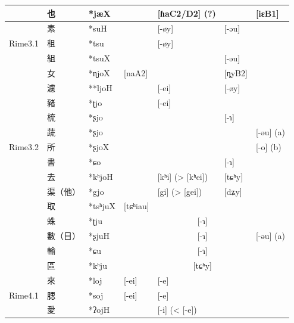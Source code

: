 \documentclass{scrbook}
\newcounter{c}[subsubsection]
\begin{document}
\begin{sloppypar}
\begin{landscape}
\begin{longtable}[htbp]{lllllll}
          & 也     & *jæX  &    & [ɦaC2/D2] (?) &       & \multicolumn{1}{l}{[iɛB1]} \\
    \midrule
    \multirow{3}[2]{*}{Rime3.1} & 素     & *suH  &       & [-øy] & [-əu] &  \\
          & 租     & *tsu  &       & [-øy] &       &  \\
          & 組     & *tsuX &       &       & [-əu] &  \\
    \midrule
    \multirow{11}[2]{*}{Rime3.2} & 女     & *ɳjoX & \multicolumn{1}{l}{[naA2]} &       & [ȵyB2] &  \\
          & 濾     & **ljoH &       & [-ei] & [-øy] &  \\
          & 豬     & *ʈjo  &       & [-ei] &       &  \\
          & 梳     & *ʂjo  &       &       & [-ɿ]  &  \\
          & 蔬     & *ʂjo  &       &       &       & \multicolumn{1}{l}{[-əu] (a)} \\
          & 所     & *ʂjoX &       &       &       & \multicolumn{1}{l}{[-o] (b)} \\
          & 書     & *ɕo   &       &       & [-ɿ]  &  \\
          & 去     & *kʰjoH &       & [kʰi] (> [kʰei]) & [tɕʰy] &  \\
          & 渠（他）  & *gjo  &       & [gi] (> [gei]) & [dʑy] &  \\
    \midrule
    \multirow{5}[2]{*}{Rime3.3} & 取     & *tsʰjuX & \multicolumn{1}{l}{[tɕʰiau]} &       &       &  \\
          & 蛛     & *ʈju  &       & \multicolumn{2}{c}{[-ɿ]} &  \\
          & 數（目）  & *ʂjuH &       & \multicolumn{2}{c}{[-ɿ]} & \multicolumn{1}{l}{[-əu] (a)} \\
          & 輸     & *ɕu   &       & \multicolumn{2}{c}{[-ɿ]} &  \\
          & 區     & *kʰju &       & \multicolumn{2}{c}{[tɕʰy]} &  \\
    \midrule
    \multirow{3}[2]{*}{Rime4.1} & 來     & *loj  & \multicolumn{1}{l}{[-ei]} & [-e]  &       &  \\
          & 腮     & *soj  & \multicolumn{1}{l}{[-ei]} & [-e]  &       &  \\
          & 愛     & *ʔojH &       & [-i] (< [-e]) &       &  \\

\end{longtable}
\end{landscape}
\end{sloppypar}
\end{document}

